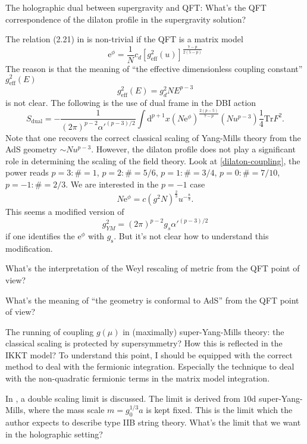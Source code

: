 
The holographic dual between supergravity and QFT:
What's the QFT correspondence of the dilaton profile in the supergravity
solution?

The relation (2.21) in  is non-trivial if the QFT is a matrix model
\begin{equation}\label{dilaton-coupling}
	\mathrm{e}^{\phi} = \frac{1}{N} c_d [g^2_{\text{eff}}(u)]^{\frac{7-p}{2(5-p)}}
\end{equation}
The reason is that the meaning of
``the effective dimensionless coupling constant'' $g_{\text{eff}}^2(E)$
\[
	g_{\text{eff}}^2(E) = g_d^2 N E^{p-3}
\] 
is not clear.
The following is the use of dual frame in the DBI action
\[
	S_{\text{dual}} = - \frac{1}{(2\pi)^{p-2}\alpha'^{(p-3) / 2}}
	\int \mathrm{d}^{p+1}x (N \mathrm{e}^\phi)^{\frac{2(p-5)}{7-p}}
	(N u^{p-3}) \frac{1}{4} \mathrm{Tr} F^2
.\] 
Note that one recovers the correct classical scaling of Yang-Mills theory from the AdS geometry $\sim N u^{p-3}$.
However, the dilaton profile does not play a significant role in determining the scaling of the field theory.
Look at \eqref{dilaton-coupling}, the power reads $p=3: \# = 1$,
$p=2: \# = 5 / 6$, $p=1: \# = 3 / 4$, $p=0: \# = 7 / 10$,
$p=-1: \# = 2 / 3$.
We are interested in the $p=-1$ case
\[
	N \mathrm{e}^\phi = c (g^2 N)^{\frac{2}{3}} u^{-\frac{8}{3}}
.\] 
This seems a modified version of
\begin{equation}
	g_{YM}^2 = (2\pi)^{p-2} g_s {\alpha'}^{(p-3) / 2}	
\end{equation}
if one identifies the $\mathrm{e}^\phi$ with $g_{\text{s}}$.
But it's not clear how to understand this modification.

What's the interpretation of the Weyl rescaling of metric from the QFT point of view?

What's the meaning of ``the geometry is conformal to AdS'' from the QFT point of view?

The running of coupling $g(\mu)$ in (maximally) super-Yang-Mills theory:
the classical scaling is protected by supersymmetry?
How this is reflected in the IKKT model?
To understand this point, I should be equipped with the correct method to deal with the fermionic integration.
Especially the technique to deal with the non-quadratic fermionic terms
in the matrix model integration.

In , a double scaling limit is discussed.
The limit is derived from $10\mathrm{d}$ super-Yang-Mills,
where the mass scale $m=g_0^{1 / 3}a$ is kept fixed.
This is the limit which the author expects to describe type IIB string theory.
What's the limit that we want in the holographic setting?

